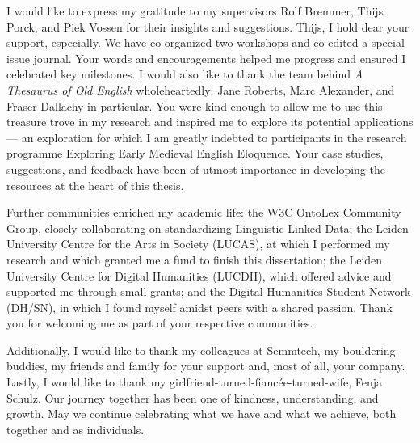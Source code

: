 I would like to express my gratitude to my supervisors Rolf Bremmer, Thijs Porck, and Piek Vossen for their insights and suggestions. Thijs, I hold dear your support, especially. We have co-organized two workshops and co-edited a special issue journal. %
Your words and encouragements helped me progress and ensured I celebrated key milestones. %
I would also like to thank the team behind \textit{A Thesaurus of Old English} wholeheartedly; Jane Roberts, Marc Alexander, and Fraser Dallachy in particular. You were kind enough to allow me to use this treasure trove in my research and inspired me to explore its potential applications --- an exploration for which I am greatly indebted to participants in the research programme Exploring Early Medieval English Eloquence. Your case studies, suggestions, and feedback have been of utmost importance in developing the resources at the heart of this thesis. %

Further communities enriched my academic life: the W3C OntoLex Community Group, closely collaborating on standardizing Linguistic Linked Data; the Leiden University Centre for the Arts in Society (LUCAS), at which I performed my research and which granted me a fund to finish this dissertation; the Leiden University Centre for Digital Humanities (LUCDH), which offered advice and supported me through small grants; and the Digital Humanities Student Network %
(DH/SN), in which I found myself amidst peers with a shared passion. 
Thank you for welcoming me as part of your respective communities.

Additionally, I would like to thank my colleagues at Semmtech, my bouldering buddies, my friends and family for your support and, most of all, your company. 
Lastly, I would like to thank my girlfriend-turned-fiancée-turned-wife, Fenja Schulz. Our journey together has been one of kindness, understanding, and growth. May we continue celebrating what we have and what we achieve, both together and as individuals.

